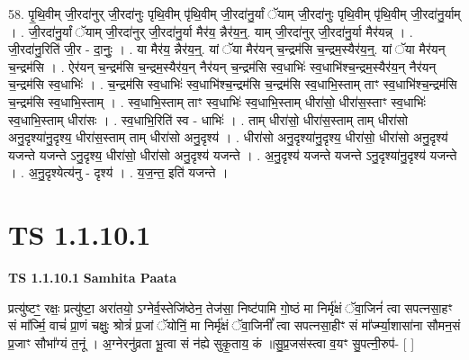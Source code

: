 \documentclass[17pt]{extarticle}
\begin{document}
58. पृ॒थि॒वीम् जी॒रदा॑नुर् जी॒रदा॑नुः पृथि॒वीम् पृ॑थि॒वीम् जी॒रदा॑नु॒र्यां ॅयाम् जी॒रदा॑नुः पृथि॒वीम् पृ॑थि॒वीम् जी॒रदा॑नु॒र्याम् । . जी॒रदा॑नु॒र्यां ॅयाम् जी॒रदा॑नुर् जी॒रदा॑नु॒र्या मैर॑य॒ न्नैर॑य॒न्॒. याम् जी॒रदा॑नुर् जी॒रदा॑नु॒र्या मैर॑यन्न् । . जी॒रदा॑नु॒रिति॑ जी॒र - दा॒नुः॒ । . या मैर॑य॒ न्नैर॑य॒न्॒. यां ॅया मैर॑यन् च॒न्द्रम॑सि च॒न्द्रम॒स्यैर॑य॒न्॒. यां ॅया मैर॑यन् च॒न्द्रम॑सि । . ऐर॑यन् च॒न्द्रम॑सि च॒न्द्रम॒स्यैर॑य॒न् नैर॑यन् च॒न्द्रम॑सि स्व॒धाभिः॑ स्व॒धाभि॑श्च॒न्द्रम॒स्यैर॑य॒न् नैर॑यन् च॒न्द्रम॑सि स्व॒धाभिः॑ । . च॒न्द्रम॑सि स्व॒धाभिः॑ स्व॒धाभि॑श्च॒न्द्रम॑सि च॒न्द्रम॑सि स्व॒धाभि॒स्ताम् ताꣳ स्व॒धाभि॑श्च॒न्द्रम॑सि च॒न्द्रम॑सि स्व॒धाभि॒स्ताम् । . स्व॒धाभि॒स्ताम् ताꣳ स्व॒धाभिः॑ स्व॒धाभि॒स्ताम् धीरा॑सो॒ धीरा॑स॒स्ताꣳ स्व॒धाभिः॑ स्व॒धाभि॒स्ताम् धीरा॑सः । . स्व॒धाभि॒रिति॑ स्व - धाभिः॑ । . ताम् धीरा॑सो॒ धीरा॑स॒स्ताम् ताम् धीरा॑सो अनु॒दृश्या॑नु॒दृश्य॒ धीरा॑स॒स्ताम् ताम् धीरा॑सो अनु॒दृश्य॑ । . धीरा॑सो अनु॒दृश्या॑नु॒दृश्य॒ धीरा॑सो॒ धीरा॑सो अनु॒दृश्य॑ यजन्ते यजन्ते ऽनु॒दृश्य॒ धीरा॑सो॒ धीरा॑सो अनु॒दृश्य॑ यजन्ते । . अ॒नु॒दृश्य॑ यजन्ते यजन्ते ऽनु॒दृश्या॑नु॒दृश्य॑ यजन्ते । . अ॒नु॒दृश्येत्य॑नु - दृश्य॑ । . य॒ज॒न्त॒ इति॑ यजन्ते । \newline
\pagebreak
{}

\section{ TS 1.1.10.1 }

\textbf{TS 1.1.10.1 } \newline
\textbf{Samhita Paata} \newline

प्रत्यु॑ष्टꣳ॒॒ रक्षः॒ प्रत्यु॑ष्टा॒ अरा॑तयो॒ ऽग्नेर्व॒स्तेजि॑ष्ठेन॒ तेज॑सा॒ निष्ट॑पामि गो॒ष्ठं मा निर्मृ॑क्षं ॅवा॒जिनं॑ त्वा सपत्नसा॒हꣳ सं मा᳚र्ज्मि॒ वाचं॑ प्रा॒णं चक्षुः॒ श्रोत्रं॑ प्र॒जां ॅयोनिं॒ मा निर्मृ॑क्षं ॅवा॒जिनीं᳚ त्वा सपत्नसा॒हीꣳ सं मा᳚र्ज्म्या॒शासा॑ना सौमन॒सं प्र॒जाꣳ सौभा᳚ग्यं त॒नूं । अ॒ग्नेरनु॑व्रता भू॒त्वा सं न॑ह्ये सुकृ॒ताय॒ कं ॥सु॒प्र॒जस॑स्त्वा व॒यꣳ सु॒पत्नी॒रुप॑- [ ] \newline
\end{document}
